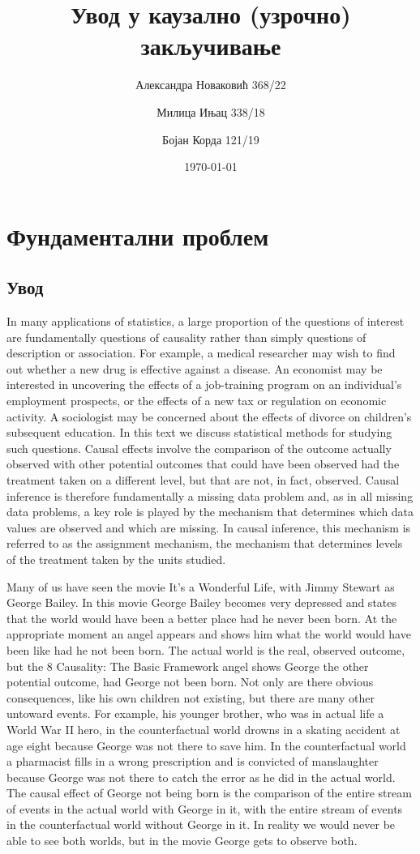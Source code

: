 \documentclass[12pt, a4paper]{article}
\title{Увод у каузално (узрочно) закључивање}
\author{Александра Новаковић 368/22}
\author{Милица Ињац 338/18}
\author{Бојан Корда 121/19}
\affil{Математички факултет, Универзитет у Београду}
\date{\today}
\begin{document}
\maketitle
\newpage

\tableofcontents
\newpage

\section{Фундаментални проблем}

    \subsection{Увод}
In many applications of statistics, a large proportion of the questions of interest are
fundamentally questions of causality rather than simply questions of description or association.
For example, a medical researcher may wish to find out whether a new drug is
effective against a disease. An economist may be interested in uncovering the effects of
a job-training program on an individual’s employment prospects, or the effects of a new
tax or regulation on economic activity. A sociologist may be concerned about the effects
of divorce on children’s subsequent education. In this text we discuss statistical methods
for studying such questions.
Causal effects involve the comparison of the outcome actually observed with other potential
outcomes that could have been observed had the treatment taken on a different level,
but that are not, in fact, observed. Causal inference is therefore fundamentally a missing
data problem and, as in all missing data problems, a key role is played by the mechanism
that determines which data values are observed and which are missing. In causal
inference, this mechanism is referred to as the assignment mechanism, the mechanism
that determines levels of the treatment taken by the units studied.

Many of us have seen the movie It’s a Wonderful Life, with
Jimmy Stewart as George Bailey. In this movie George Bailey becomes very depressed
and states that the world would have been a better place had he never been born. At
the appropriate moment an angel appears and shows him what the world would have
been like had he not been born. The actual world is the real, observed outcome, but the
8 Causality: The Basic Framework
angel shows George the other potential outcome, had George not been born. Not only are
there obvious consequences, like his own children not existing, but there are many other
untoward events. For example, his younger brother, who was in actual life a World War
II hero, in the counterfactual world drowns in a skating accident at age eight because
George was not there to save him. In the counterfactual world a pharmacist fills in a
wrong prescription and is convicted of manslaughter because George was not there to
catch the error as he did in the actual world. The causal effect of George not being born
is the comparison of the entire stream of events in the actual world with George in it, with
the entire stream of events in the counterfactual world without George in it. In reality we
would never be able to see both worlds, but in the movie George gets to observe both.
\end{document}
